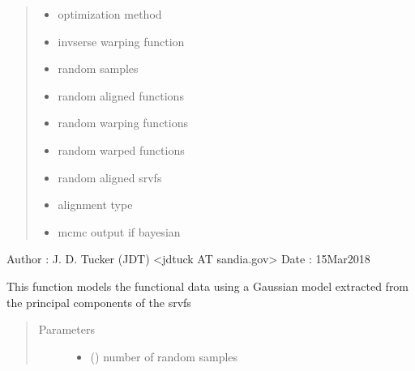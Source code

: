 \documentclass[letterpaper,10pt,english]{sphinxmanual}
\begin{document}
\begin{fulllineitems}
\begin{quote}
\begin{description}
\begin{itemize}
\item {} 
 \textendash{} optimization method

\item {} 
 \textendash{} invserse warping function

\item {} 
 \textendash{} random samples

\item {} 
 \textendash{} random aligned functions

\item {} 
 \textendash{} random warping functions

\item {} 
 \textendash{} random warped functions

\item {} 
 \textendash{} random aligned srvfs

\item {} 
 \textendash{} alignment type

\item {} 
 \textendash{} mcmc output if bayesian

\end{itemize}

\end{description}\end{quote}

Author :  J. D. Tucker (JDT) \textless{}jdtuck AT sandia.gov\textgreater{}
Date   :  15\sphinxhyphen{}Mar\sphinxhyphen{}2018

\begin{fulllineitems}
\label{\detokenize{time_warping:time_warping.fdawarp.gauss_model}}
This function models the functional data using a Gaussian model
extracted from the principal components of the srvfs
\begin{quote}\begin{description}
\item[{Parameters}] \leavevmode\begin{itemize}
\item {} 
 () \textendash{} number of random samples


\end{itemize}
\end{description}
\end{quote}
\end{fulllineitems}
\end{fulllineitems}
\end{document}
